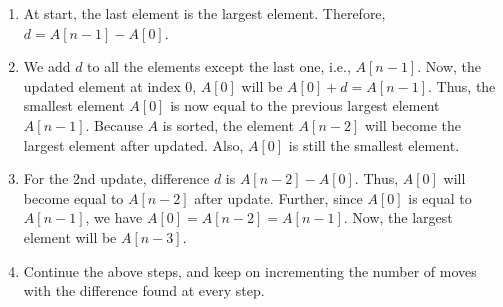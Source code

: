 \begin{enumerate}
\item At start, the last element is the largest element. Therefore, $d = A[n-1]-A[0]$. 
\item We add $d$ to all the elements except the last one, i.e., $A[n-1]$. Now, the updated element at index 0, $A[0]$ will be $A[0]+d = A[n-1]$. Thus, the smallest element $A[0]$ is now equal to the previous largest element $A[n-1]$. Because $A$ is sorted, the element $A[n-2]$ will become the largest element after updated. Also, $A[0]$ is still the smallest element.
\item For the 2nd update, difference $d$ is $A[n-2]-A[0]$. Thus, $A[0]$ will become equal to $A[n-2]$ after update. Further, since $A[0]$ is equal to $A[n-1]$, we have $A[0]=A[n-2]=A[n-1]$. Now, the largest element will be $A[n-3]$. 

\item Continue the above steps, and keep on incrementing the number of moves with the difference found at every step.
\end{enumerate}